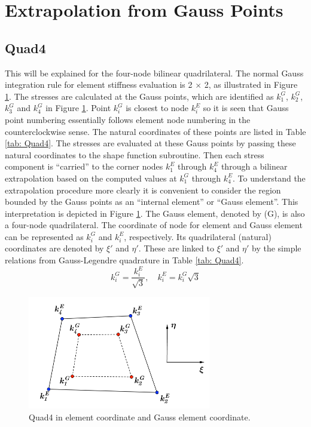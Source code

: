 \documentclass{article}
\begin{document}
 
 

\section{Extrapolation from Gauss Points}
\subsection{Quad4}
This will be explained for the four-node bilinear quadrilateral. The normal Gauss integration
rule for element stiffness evaluation is 2 $\times$ 2, as illustrated in Figure \ref{fig: Quad4_1}.
The stresses are calculated at the Gauss points, which are identified as $k_1^G$, $k_2^G$, $k_3^G$ and $k_4^G$ in Figure \ref{fig: Quad4_1}. Point $k_i^G$ is closest to node $k_i^E$ so it is seen that Gauss point numbering essentially follows element node numbering in the counterclockwise sense. The natural coordinates of these points are listed in Table \ref{tab: Quad4}. The stresses are evaluated at these Gauss points by passing these natural coordinates to the shape function subroutine. Then each stress component is “carried” to the corner nodes $k_1^E$ through $k_4^E$ through a bilinear extrapolation based on the computed values at $k_1^G$ through $k_4^E$.
To understand the extrapolation procedure more clearly it is convenient to consider the region bounded by the Gauss points as an “internal element” or “Gauss element”. This interpretation is depicted in Figure \ref{fig: Quad4_1}. The Gauss element, denoted by (G), is also a four-node quadrilateral. The coordinate of node for element and Gauss element can be represented as $k_i^G$ and $k_i^E$, respectively. Its quadrilateral (natural) coordinates are denoted by $\xi′$ and $\eta′$. 
These are linked to $\xi′$ and $\eta′$ by the simple relations from Gauss-Legendre quadrature in Table \ref{tab: Quad4}.
\begin{equation}
k_i^G = \frac{k_i^E}{\sqrt{3}},\quad
k_i^E= k_i^G\sqrt{3}
\end{equation}




\begin{figure}[h]
	\begin{center}
		\includegraphics[width=8cm,clip]{Quad4_1.pdf}			
		\caption{Quad4 in element coordinate and Gauss element coordinate.}	\label{fig: Quad4_1}
	\end{center} 
\end{figure}
\end{document}
